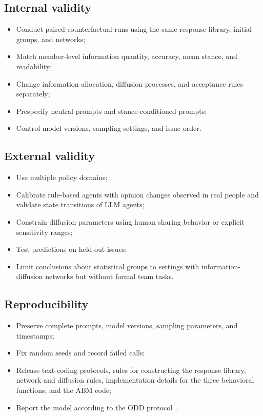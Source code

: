 \documentclass[11pt,a4paper]{article}
\begin{document}
\subsection{Internal validity}

\begin{itemize}
\item Conduct paired counterfactual runs using the same response library, initial groups, and networks;
\item Match member-level information quantity, accuracy, mean stance, and readability;
\item Change information allocation, diffusion processes, and acceptance rules separately;
\item Prespecify neutral prompts and stance-conditioned prompts;
\item Control model versions, sampling settings, and issue order.
\end{itemize}

\subsection{External validity}

\begin{itemize}
\item Use multiple policy domains;
\item Calibrate rule-based agents with opinion changes observed in real people and validate state transitions of LLM agents;
\item Constrain diffusion parameters using human sharing behavior or explicit sensitivity ranges;
\item Test predictions on held-out issues;
\item Limit conclusions about statistical groups to settings with information-diffusion networks but without formal team tasks.
\end{itemize}

\subsection{Reproducibility}

\begin{itemize}
\item Preserve complete prompts, model versions, sampling parameters, and timestamps;
\item Fix random seeds and record failed calls;
\item Release text-coding protocols, rules for constructing the response library, network and diffusion rules, implementation details for the three behavioral functions, and the ABM code;
\item Report the model according to the ODD protocol~\citep{grimm2020}.
\end{itemize}
\end{document}
